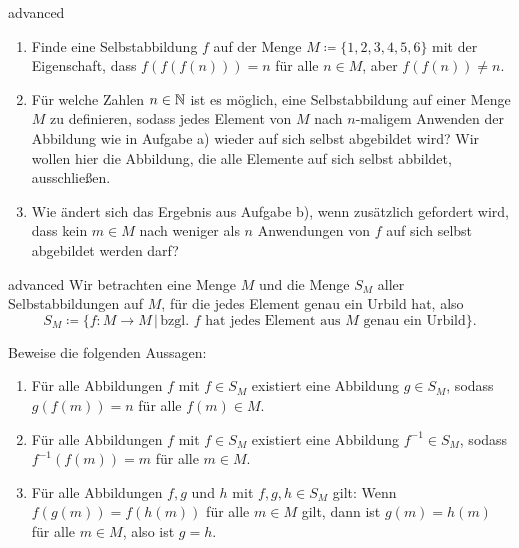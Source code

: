 \documentclass[../abbildungen.tex]{subfiles}
\begin{document}
\begin{exercise}{advanced}
    \begin{enumerate}
        \item Finde eine Selbstabbildung $f$ auf der Menge $M\coloneqq\{1,2,3,4,5,6\}$ mit der Eigenschaft, dass $f(f(f(n)))=n$ für alle $n\in M$, aber $f(f(n))\neq n$.
        \item Für welche Zahlen $n\in\mathbb{N}$ ist es möglich, eine Selbstabbildung auf einer Menge $M$ zu definieren, sodass jedes Element von $M$ nach $n$-maligem Anwenden der Abbildung wie in Aufgabe a) wieder auf sich selbst abgebildet wird? Wir wollen hier die Abbildung, die alle Elemente auf sich selbst abbildet, ausschließen.
        \item Wie ändert sich das Ergebnis aus Aufgabe b), wenn zusätzlich gefordert wird, dass kein $m\in M$ nach weniger als $n$ Anwendungen von $f$ auf sich selbst abgebildet werden darf?
    \end{enumerate}
\end{exercise}

\begin{exercise}{advanced}
    Wir betrachten eine Menge $M$ und die Menge $S_M$ aller Selbstabbildungen auf $M$, für die jedes Element genau ein Urbild hat, also \[S_M\coloneqq\{f\colon M\rightarrow M\,|\,\text{bzgl. $f$ hat jedes Element aus $M$ genau ein Urbild}\}.\]
    
    Beweise die folgenden Aussagen:
    \begin{enumerate}
        \item Für alle Abbildungen $f$ mit $f\in S_M$ existiert eine Abbildung $g\in S_M$, sodass \mbox{$g(f(m))=n$} für alle $f(m)\in M$.
        \item Für alle Abbildungen $f$ mit $f\in S_M$ existiert eine Abbildung $f^{-1}\in S_M$, sodass $f^{-1}(f(m))=m$ für alle $m\in M$.
        \item Für alle Abbildungen $f,g$ und $h$ mit $f,g,h\in S_M$ gilt: Wenn $f(g(m))=f(h(m))$ für alle $m\in M$ gilt, dann ist $g(m)=h(m)$ für alle $m\in M$, also ist $g=h$.
    \end{enumerate}
\end{exercise}
\end{document}
